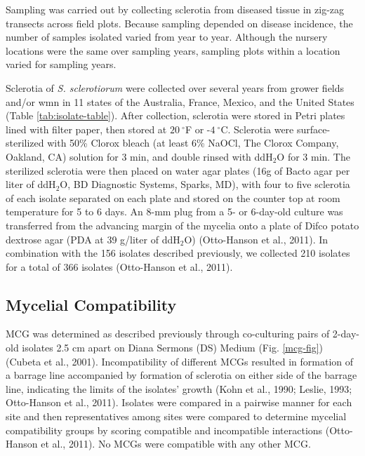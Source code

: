 \documentclass[fleqn,10pt,lineno]{wlpeerj} %
\theoremstyle{definition}
\theoremstyle{definition}
\theoremstyle{definition}
\theoremstyle{remark}
\begin{document}
Sampling was carried out by collecting sclerotia from diseased tissue in
zig-zag transects across field plots. Because sampling depended on
disease incidence, the number of samples isolated varied from year to
year. Although the nursery locations were the same over sampling years,
sampling plots within a location varied for sampling years.

Sclerotia of \emph{S. sclerotiorum} were collected over several years
from grower fields and/or wmn in 11 states of the Australia, France,
Mexico, and the United States (Table \ref{tab:isolate-table}). After
collection, sclerotia were stored in Petri plates lined with filter
paper, then stored at \(20~^{\circ}\)F or -\(4~^{\circ}\)C. Sclerotia
were surface-sterilized with 50\% Clorox bleach (at least 6\% NaOCl, The
Clorox Company, Oakland, CA) solution for 3 min, and double rinsed with
ddH\(_2\)O for 3 min. The sterilized sclerotia were then placed on water
agar plates (16g of Bacto agar per liter of ddH\(_2\)O, BD Diagnostic
Systems, Sparks, MD), with four to five sclerotia of each isolate
separated on each plate and stored on the counter top at room
temperature for 5 to 6 days. An 8-mm plug from a 5- or 6-day-old culture
was transferred from the advancing margin of the mycelia onto a plate of
Difco potato dextrose agar (PDA at 39 g/liter of ddH\(_2\)O)
(Otto-Hanson et al., 2011). In combination with the 156 isolates
described previously, we collected 210 isolates for a total of 366
isolates (Otto-Hanson et al., 2011).

\subsection*{Mycelial Compatibility}\label{mycelial-compatibility}

MCG was determined as described previously through co-culturing pairs of
2-day-old isolates 2.5 cm apart on Diana Sermons (DS) Medium (Fig.
\ref{mcg-fig}) (Cubeta et al., 2001). Incompatibility of different MCGs
resulted in formation of a barrage line accompanied by formation of
sclerotia on either side of the barrage line, indicating the limits of
the isolates' growth (Kohn et al., 1990; Leslie, 1993; Otto-Hanson et
al., 2011). Isolates were compared in a pairwise manner for each site
and then representatives among sites were compared to determine mycelial
compatibility groups by scoring compatible and incompatible interactions
(Otto-Hanson et al., 2011). No MCGs were compatible with any other MCG.
\end{document}
